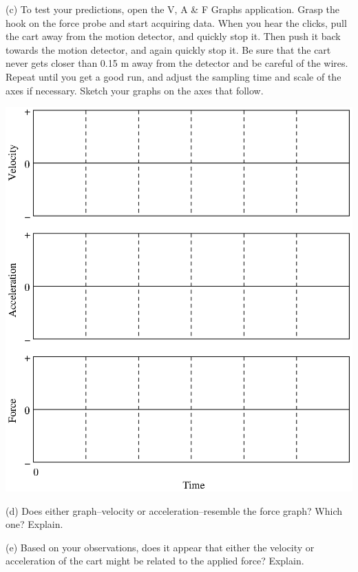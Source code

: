 (c) To test your predictions, open the V, A \& F Graphs application. Grasp the
hook on the force probe and start acquiring data. When you hear the clicks,
pull the cart away from the motion detector, and quickly stop it. Then push
it back towards the motion detector, and again quickly stop it. Be sure that
the cart never gets closer than 0.15 m away from the detector and be careful
of the wires. Repeat until you get a good run, and adjust the sampling time
and scale of the axes if necessary. Sketch your graphs on the axes that follow.

\vspace{0.3cm}
{\par\centering \includegraphics{force1_fig2.eps} \par}
\vspace{0.3cm}

(d) Does either graph--velocity or acceleration--resemble the force graph? Which
one? Explain.
\vspace{20mm}

(e) Based on your observations, does it appear that either the velocity or acceleration
of the cart might be related to the applied force? Explain.
\vspace{20mm}

